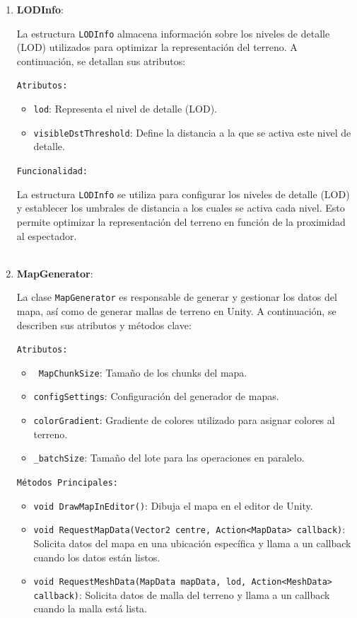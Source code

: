 \begin{enumerate}
    \item \textbf{LODInfo}:

    La estructura \texttt{LODInfo} almacena información sobre los niveles de detalle (LOD) utilizados para optimizar la representación del terreno. A continuación, se detallan sus atributos:

    \texttt{Atributos:}

    \begin{itemize}
        \item \texttt{lod}: Representa el nivel de detalle (LOD).
        \item \texttt{visibleDstThreshold}: Define la distancia a la que se activa este nivel de detalle.
    \end{itemize}

    \texttt{Funcionalidad:}

    La estructura \texttt{LODInfo} se utiliza para configurar los niveles de detalle (LOD) y establecer los umbrales de distancia a los cuales se activa cada nivel. Esto permite optimizar la representación del terreno en función de la proximidad al espectador.\\
    \\
 
    \item \textbf{MapGenerator}:

    La clase \texttt{MapGenerator} es responsable de generar y gestionar los datos del mapa, así como de generar mallas de terreno en Unity. A continuación, se describen sus atributos y métodos clave:

    \texttt{Atributos:}

    \begin{itemize}
        \item \texttt{ MapChunkSize}: Tamaño de los chunks del mapa.
        \item \texttt{configSettings}: Configuración del generador de mapas.
        \item \texttt{colorGradient}: Gradiente de colores utilizado para asignar colores al terreno.
        \item \texttt{\_batchSize}: Tamaño del lote para las operaciones en paralelo.
    \end{itemize}

    \texttt{Métodos Principales:}

    \begin{itemize}
        \item \texttt{void DrawMapInEditor()}: Dibuja el mapa en el editor de Unity.
        \item \texttt{void RequestMapData(Vector2 centre, Action<MapData> callback)}: Solicita datos del mapa en una ubicación específica y llama a un callback cuando los datos están listos.
        \item \texttt{void RequestMeshData(MapData mapData,  lod, Action<MeshData> callback)}: Solicita datos de malla del terreno y llama a un callback cuando la malla está lista.
    \end{itemize}


\end{enumerate}
